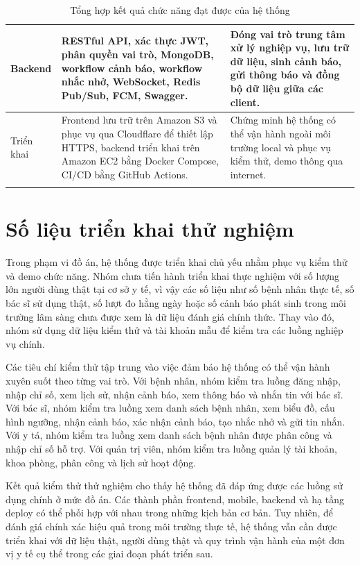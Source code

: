 \begin{center}
\begin{longtable}{|p{3.2cm}|p{5cm}|p{6.2cm}|}
    Backend &
    RESTful API, xác thực JWT, phân quyền vai trò, MongoDB, workflow cảnh báo, workflow nhắc nhở, WebSocket, Redis Pub/Sub, FCM, Swagger. &
    Đóng vai trò trung tâm xử lý nghiệp vụ, lưu trữ dữ liệu, sinh cảnh báo, gửi thông báo và đồng bộ dữ liệu giữa các client. \\
    \hline

    Triển khai &
    Frontend lưu trữ trên Amazon S3 và phục vụ qua Cloudflare để thiết lập HTTPS, backend triển khai trên Amazon EC2 bằng Docker Compose, CI/CD bằng GitHub Actions. &
    Chứng minh hệ thống có thể vận hành ngoài môi trường local và phục vụ kiểm thử, demo thông qua internet. \\
    \hline

    \caption{Tổng hợp kết quả chức năng đạt được của hệ thống}
    \label{chapter5-table01}
\end{longtable}
\end{center}

\section{Số liệu triển khai thử nghiệm}

\par Trong phạm vi đồ án, hệ thống được triển khai chủ yếu nhằm phục vụ kiểm thử và demo chức năng. Nhóm chưa tiến hành triển khai thực nghiệm với số lượng lớn người dùng thật tại cơ sở y tế, vì vậy các số liệu như số bệnh nhân thực tế, số bác sĩ sử dụng thật, số lượt đo hằng ngày hoặc số cảnh báo phát sinh trong môi trường lâm sàng chưa được xem là dữ liệu đánh giá chính thức. Thay vào đó, nhóm sử dụng dữ liệu kiểm thử và tài khoản mẫu để kiểm tra các luồng nghiệp vụ chính.

\par Các tiêu chí kiểm thử tập trung vào việc đảm bảo hệ thống có thể vận hành xuyên suốt theo từng vai trò. Với bệnh nhân, nhóm kiểm tra luồng đăng nhập, nhập chỉ số, xem lịch sử, nhận cảnh báo, xem thông báo và nhắn tin với bác sĩ. Với bác sĩ, nhóm kiểm tra luồng xem danh sách bệnh nhân, xem biểu đồ, cấu hình ngưỡng, nhận cảnh báo, xác nhận cảnh báo, tạo nhắc nhở và gửi tin nhắn. Với y tá, nhóm kiểm tra luồng xem danh sách bệnh nhân được phân công và nhập chỉ số hỗ trợ. Với quản trị viên, nhóm kiểm tra luồng quản lý tài khoản, khoa phòng, phân công và lịch sử hoạt động.

\par Kết quả kiểm thử thử nghiệm cho thấy hệ thống đã đáp ứng được các luồng sử dụng chính ở mức đồ án. Các thành phần frontend, mobile, backend và hạ tầng deploy có thể phối hợp với nhau trong những kịch bản cơ bản. Tuy nhiên, để đánh giá chính xác hiệu quả trong môi trường thực tế, hệ thống vẫn cần được triển khai với dữ liệu thật, người dùng thật và quy trình vận hành của một đơn vị y tế cụ thể trong các giai đoạn phát triển sau.


